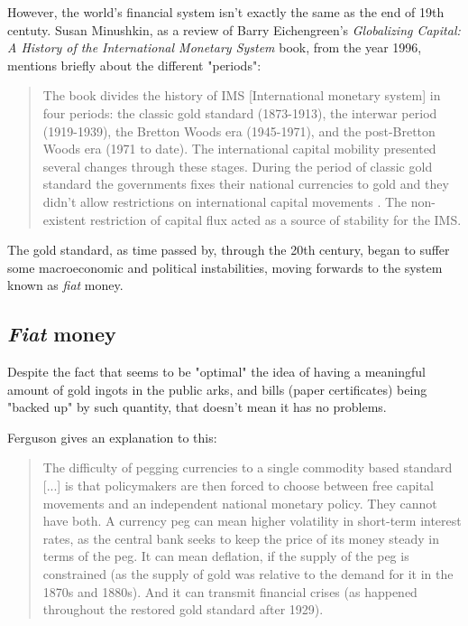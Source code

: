 \documentclass[12pt,a4paper,twoside]{book}
\begin{document}
However, the world's financial system isn't exactly the same as the end of 19th centuty. Susan Minushkin, as a review of Barry Eichengreen's \textit{Globalizing Capital: A History of the International Monetary System} book, from the year 1996, mentions briefly about the different "periods":

\begin{quotation}
The book divides the history of IMS [International monetary system] in four periods: the classic gold standard (1873-1913), the interwar period (1919-1939), the Bretton Woods era (1945-1971), and the post-Bretton Woods era (1971 to date). The international capital mobility presented several changes through these stages. During the period of classic gold standard the governments fixes their national currencies to gold and they didn't allow restrictions on international capital movements . The non-existent restriction of capital flux acted as a source of stability for the IMS. \cite[pág. 275]{susan-capital}
\end{quotation}

The gold standard, as time passed by, through the 20th century, began to suffer some macroeconomic and political instabilities, moving forwards to the system known as \textit{fiat} money.

\subsection{\textit{Fiat} money}
Despite the fact that seems to be "optimal" the idea of having a meaningful amount of gold ingots in the public arks, and bills (paper certificates) being "backed up" by such quantity, that doesn't mean it has no problems.

Ferguson gives an explanation to this:

\begin{quotation}
The difficulty of pegging currencies to a single commodity based standard [...] is that policymakers are then forced to choose between free capi­tal movements and an independent national monetary policy. They cannot have both. A currency peg can mean higher volatility in short-term interest rates, as the central bank seeks to keep the price of its money steady in terms of the peg. It can mean deflation, if the supply of the peg is constrained (as the supply of gold was relative to the demand for it in the 1870s and 1880s). And it can transmit financial crises (as happened throughout the restored gold standard after 1929). \cite[pp. 58]{ferguson:ascent-money}
\end{quotation}
\end{document}
